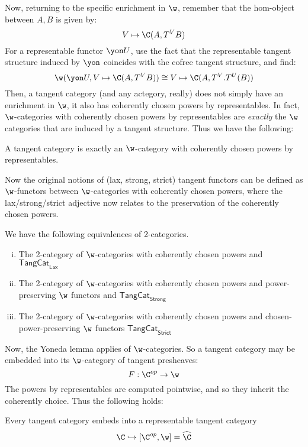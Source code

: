 Now, returning to the specific enrichment in $\w$, remember that the hom-object between $A,B$ is given by:
\[	
	V \mapsto \C(A,T^V B)
\]
For a representable functor $\yon U$, use the fact that the representable tangent structure induced by $\yon$ coincides with the cofree tangent structure, and find:
\[
	\w(\yon U, V \mapsto \C(A, T^VB)) \cong V \mapsto \C(A, T^V.T^U(B))
\]
Then, a tangent category (and any actegory, really) does not simply have an enrichment in $\w$, it also has coherently chosen powers by representables. In fact, $\w$-categories with coherently chosen powers by representables are \emph{exactly} the $\w$ categories that are induced by a tangent structure. Thus we have the following:
\begin{proposition}
	A tangent category is exactly an $\w$-category with coherently chosen powers by representables.
\end{proposition}
Now the original notions of (lax, strong, strict) tangent functors can be defined as $\w$-functors between $\w$-categories with coherently chosen powers, where the lax/strong/strict adjective now relates to the preservation of the coherently chosen powers.
\begin{theorem}
	We have the following equivalences of 2-categories.
	\begin{enumerate}[(i)]
		\item The 2-category of $\w$-categories with coherently chosen powers and $\mathsf{TangCat}_{\mathsf{Lax}}$
		\item The 2-category of $\w$-categories with coherently chosen powers and power-preserving $\w$ functors  and $\mathsf{TangCat}_{\mathsf{Strong}}$
		\item The 2-category of $\w$-categories with coherently chosen powers and chosen-power-preserving $\w$ functors $\mathsf{TangCat}_{\mathsf{Strict}}$
	\end{enumerate}
\end{theorem}
Now, the Yoneda lemma applies of $\w$-categories. So a tangent category may be embedded into its $\w$-category of tangent presheaves:
\[
	F: \C^{op} \to \w 
\]
The powers by representables are computed pointwise, and so they inherit the coherently choice. Thus the following holds:
\begin{corollary}
	Every tangent category embeds into a representable tangent category
	\[
		\C \hookrightarrow [\C^{op},\w] = \widehat\C
	\]
\end{corollary}

